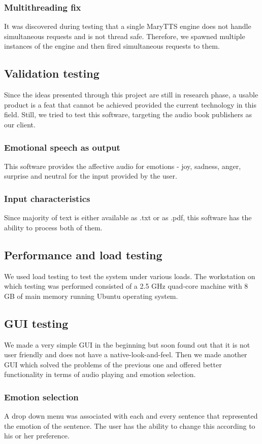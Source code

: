 \documentclass[oneside,a4paper,12pt]{book}
\begin{document}
\subsubsection{Multithreading fix}
It was discovered during testing that a single MaryTTS engine does not handle simultaneous requests and is not thread safe. Therefore, we spawned multiple instances of the engine and then fired simultaneous requests to them.

\subsection{Validation testing}
Since the ideas presented through this project are still in research phase, a usable product is a feat that cannot be achieved provided the current technology in this field. Still, we tried to test this software, targeting the audio book publishers as our client.
\subsubsection{Emotional speech as output}
This software provides the affective audio for emotions - joy, sadness, anger, surprise and neutral for the input provided by the user.
\subsubsection{Input characteristics}
Since majority of text is either available as .txt or as .pdf, this software has the ability to process both of them.

\subsection{Performance and load testing}
We used load testing to test the system under various loads. The workstation on which testing was performed consisted of a 2.5 GHz quad-core machine with 8 GB of main memory running Ubuntu operating system.

\subsection{GUI testing}
We made a very simple GUI in the beginning but soon found out that it is not user friendly and does not have a native-look-and-feel. Then we made another GUI which solved the problems of the previous one and offered better functionality in terms of audio playing and emotion selection.
\subsubsection{Emotion selection}
A drop down menu was associated with each and every sentence that represented the emotion of the sentence. The user has the ability to change this according to his or her preference.
\end{document}
